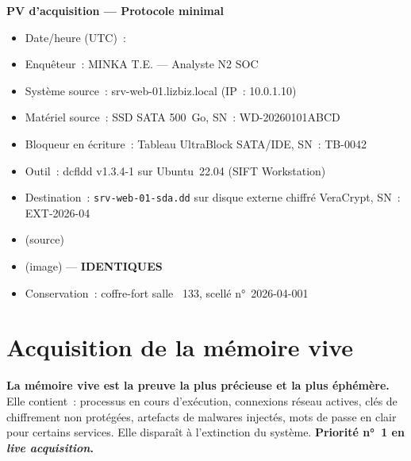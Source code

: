 \begin{boxcustody}
\textbf{PV d'acquisition --- Protocole minimal}

\begin{itemize}
  \item Date/heure (UTC)~: 
  \item Enquêteur~: MINKA T.E. --- Analyste N2 SOC
  \item Système source~: srv-web-01.lizbiz.local (IP~: 10.0.1.10)
  \item Matériel source~: SSD SATA 500~Go, SN~: WD-20260101ABCD
  \item Bloqueur en écriture~: Tableau UltraBlock SATA/IDE, SN~: TB-0042
  \item Outil~: dcfldd v1.3.4-1 sur Ubuntu~22.04 (SIFT Workstation)
  \item Destination~: \texttt{srv-web-01-sda.dd} sur disque externe
        chiffré VeraCrypt, SN~: EXT-2026-04
  \item {} (source)
  \item {} (image) --- \textbf{IDENTIQUES}
  \item Conservation~: coffre-fort salle ~133, scellé n°~2026-04-001
\end{itemize}
\end{boxcustody}

\section{Acquisition de la mémoire vive}
\label{sec:acq-ram}

\begin{boxalert}
\textbf{La mémoire vive est la preuve la plus précieuse et la plus éphémère.}
Elle contient~: processus en cours d'exécution, connexions réseau actives,
clés de chiffrement non protégées, artefacts de malwares injectés,
mots de passe en clair pour certains services. Elle disparaît à l'extinction
du système. \textbf{Priorité n°~1 en \textit{live acquisition}.}
\end{boxalert}

